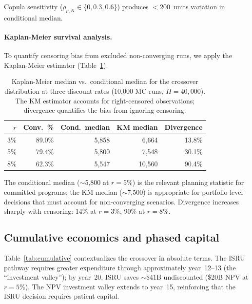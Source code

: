 \documentclass[preprint,12pt]{elsarticle}
\begin{document}
Copula sensitivity ($\rho_{p,K} \in \{0, 0.3, 0.6\}$) produces $<$200~units variation in conditional median.

\paragraph{Kaplan-Meier survival analysis.} To quantify censoring bias from excluded non-converging runs, we apply the Kaplan-Meier estimator \cite{kaplan1958} (Table~\ref{tab:kaplan_meier}).

\begin{table}[htbp]
\centering
\caption{Kaplan-Meier median vs.\ conditional median for the crossover distribution at three discount rates (10{,}000 MC runs, $H = 40{,}000$). The KM estimator accounts for right-censored observations; divergence quantifies the bias from ignoring censoring.}
\label{tab:kaplan_meier}
\small
\begin{tabular}{@{}rrrrr@{}}
\toprule
$r$ & Conv.\ \% & Cond.\ median & KM median & Divergence \\
\midrule
3\%  & 89.0\% & 5{,}858 & 6{,}664  & 13.8\% \\
5\%  & 79.4\% & 5{,}800 & 7{,}548  & 30.1\% \\
8\%  & 62.3\% & 5{,}547 & 10{,}560 & 90.4\% \\
\bottomrule
\end{tabular}
\end{table}

The conditional median ($\sim$5{,}800 at $r = 5\%$) is the relevant planning statistic for committed programs; the KM median ($\sim$7{,}500) is appropriate for portfolio-level decisions that must account for non-converging scenarios. Divergence increases sharply with censoring: 14\% at $r = 3\%$, 90\% at $r = 8\%$.

\subsection{Cumulative economics and phased capital}
\label{sec:phased_capital}

Table~\ref{tab:cumulative} contextualizes the crossover in absolute terms. The ISRU pathway requires greater expenditure through approximately year~12--13 (the ``investment valley''); by year~20, ISRU saves $\sim$\$41B undiscounted (\$20B NPV at $r = 5\%$). The NPV investment valley extends to year~15, reinforcing that the ISRU decision requires patient capital.
\end{document}
